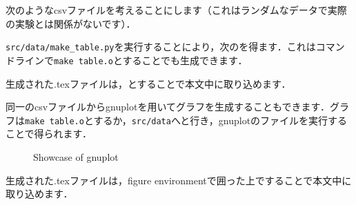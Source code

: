 次のようなcsvファイルを考えることにします（これはランダムなデータで実際の実験とは関係がないです）．

\verb|src/data/make_table.py|を実行することにより，次のを得ます．これはコマンドラインで\verb|make table.o|とすることでも生成できます．

生成された.texファイルは，\verb||とすることで本文中に取り込めます．


同一のcsvファイルからgnuplotを用いてグラフを生成することもできます．グラフは\verb|make table.o|とするか，\verb|src/data|へと行き，gnuplotのファイルを実行することで得られます．
\begin{figure}[H]\centering
  
  \caption{Showcase of gnuplot}
  \label{fig:goes_brrrrrrrrr}
\end{figure}
生成された.texファイルは，figure environmentで囲った上で\verb||することで本文中に取り込めます．

